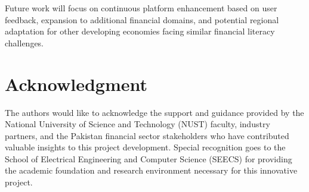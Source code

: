 \documentclass[conference]{IEEEtran}
\begin{document}
Future work will focus on continuous platform enhancement based on user feedback, expansion to additional financial domains, and potential regional adaptation for other developing economies facing similar financial literacy challenges.

\section*{Acknowledgment}

The authors would like to acknowledge the support and guidance provided by the National University of Science and Technology (NUST) faculty, industry partners, and the Pakistan financial sector stakeholders who have contributed valuable insights to this project development. Special recognition goes to the School of Electrical Engineering and Computer Science (SEECS) for providing the academic foundation and research environment necessary for this innovative project.
\end{document}
